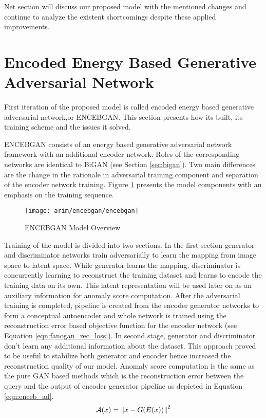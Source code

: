 Net section will discuss our proposed model with the mentioned changes and continue to analyze the
existent shortcomings despite these applied improvements.


\section{Encoded Energy Based Generative Adversarial Network}
\label{sec:encebgan}

First iteration of the proposed model is called encoded energy based generative adversarial
network,or ENCEBGAN. This section presents how its built, its training scheme and the issues it
solved.

ENCEBGAN consists of an energy based generative adversarial network framework with an additional
encoder network. Roles of the corresponding networks are identical to BiGAN (see Section \ref{sec:bigan}). Two main
differences are the change in the rationale in adversarial training component and separation of the
encoder network training. Figure \ref{fig:encebgan_model} presents the model components with an
emphasis on the training sequence.
\begin{figure}[h!]
	\centering
	\texttt{[image: arim/encebgan/encebgan]}
	\caption{ENCEBGAN Model Overview }
	\label{fig:encebgan_model}
\end{figure}

Training of the model is divided into two sections. In the first section generator and discriminator networks
train adversarially to learn the mapping from image space to latent space. While generator learns
the mapping, discriminator is concurrently learning to reconstruct the training dataset and learns
to encode the training data on its own. This latent representation will be used later on as an
auxiliary information for anomaly score computation. After the adversarial training is completed,
pipeline is created from the encoder generator networks to form a conceptual autoencoder and whole
network is trained using the reconstruction error based objective function for the encoder network (see Equation \ref{eqn:fanogan_rec_loss}).
In second stage, generator and discriminator don't learn any additional information about the
dataset. This approach proved to be useful to stabilize both generator and encoder hence increased
the reconstruction quality of our model. Anomaly score computation is the same as the pure GAN based
methods which is the reconstruction error between the query and the output of encoder generator
pipeline as depicted in Equation \ref{eqn:enceb_ad}. 
\begin{equation}
	\label{eqn:enceb_ad}
	\mathcal{A}(x) = \left\lVert x - G(E(x))\right\rVert^2
\end{equation}

